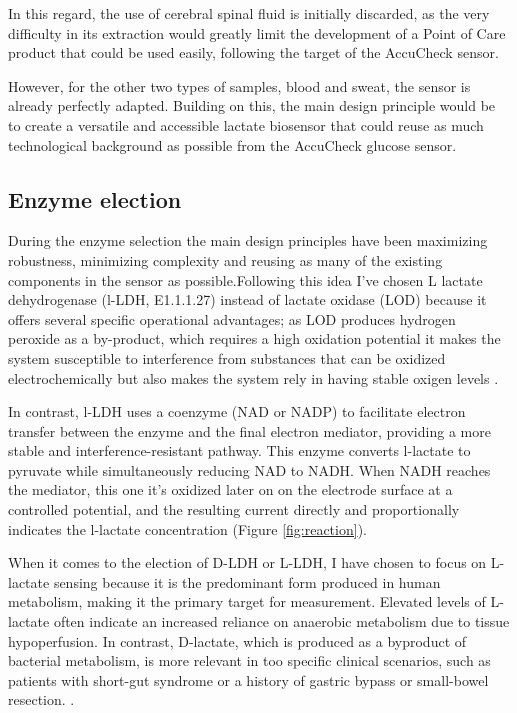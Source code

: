 \documentclass[conference]{IEEEtran}
\begin{document}
In this regard, the use of cerebral spinal fluid is initially discarded, as the 
very difficulty in its extraction would greatly limit the development of a 
Point of Care product that could be used easily, following the target of 
the AccuCheck sensor.

However, for the other two types of samples, blood and sweat, the sensor 
is already perfectly adapted. Building on this, the main design principle would be to 
create a versatile and accessible lactate biosensor that could reuse as much technological background as possible 
from the AccuCheck glucose sensor.

\subsection{Enzyme election}
During the enzyme selection the main design principles have been maximizing robustness, minimizing complexity and
reusing as many of the existing components in the sensor as possible.Following this idea I've chosen L lactate dehydrogenase (l-LDH, E1.1.1.27) instead 
of lactate oxidase (LOD) because it offers several specific operational advantages; as LOD produces hydrogen 
peroxide as a by-product, which requires a high oxidation potential it makes the system 
susceptible to interference from substances that can be oxidized electrochemically but also makes the system rely in having stable oxigen levels
 \cite{ratheeBiosensorsBasedElectrochemical2015}. 

In contrast, l-LDH uses a coenzyme (NAD or NADP) to facilitate electron transfer between the enzyme and 
the final electron mediator, providing a more stable and interference-resistant pathway. This enzyme converts l-lactate 
to pyruvate while simultaneously reducing NAD to NADH. When NADH reaches the mediator, this one it's oxidized later on on the electrode surface
at a controlled potential, and the resulting current directly and proportionally indicates the l-lactate 
concentration (Figure \ref{fig:reaction}). 

When it comes to the election of D-LDH or L-LDH, I have chosen to focus on L-lactate sensing because it is the predominant form produced in human metabolism,
 making it the primary target for measurement. Elevated levels of L-lactate often indicate an increased reliance on anaerobic
  metabolism due to tissue hypoperfusion. In contrast, D-lactate, which is produced as a byproduct of bacterial metabolism, 
  is more relevant in too specific clinical scenarios, such as patients with short-gut syndrome or a history of gastric 
  bypass or small-bowel resection. \cite{LacticAcidosisBackground2020}.
\end{document}
